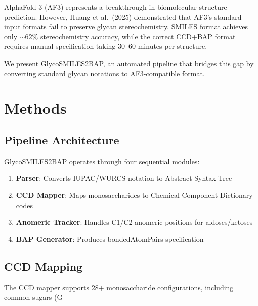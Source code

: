 \documentclass[11pt,a4paper]{article}
\begin{document}
AlphaFold 3 (AF3) represents a breakthrough in biomolecular structure prediction. However, Huang et al.\ (2025) demonstrated that AF3's standard input formats fail to preserve glycan stereochemistry. SMILES format achieves only ${\sim}62\%$ stereochemistry accuracy, while the correct CCD+BAP format requires manual specification taking 30--60 minutes per structure.

We present GlycoSMILES2BAP, an automated pipeline that bridges this gap by converting standard glycan notations to AF3-compatible format.

\section{Methods}

\subsection{Pipeline Architecture}

GlycoSMILES2BAP operates through four sequential modules:

\begin{enumerate}
\item \textbf{Parser}: Converts IUPAC/WURCS notation to Abstract Syntax Tree
\item \textbf{CCD Mapper}: Maps monosaccharides to Chemical Component Dictionary codes
\item \textbf{Anomeric Tracker}: Handles C1/C2 anomeric positions for aldoses/ketoses
\item \textbf{BAP Generator}: Produces bondedAtomPairs specification
\end{enumerate}

\subsection{CCD Mapping}

The CCD mapper supports 28+ monosaccharide configurations, including common sugars (G
\end{document}
